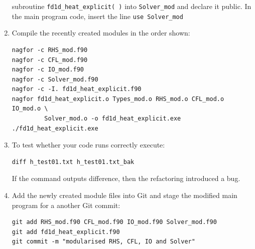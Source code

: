 \documentclass[12pt]{article}
\begin{document}
\begin{enumerate}
  subroutine \texttt{fd1d\_heat\_explicit( )} into \texttt{Solver\_mod} and declare it public. In the main
  program code, insert the line \texttt{use Solver\_mod}
\item Compile the recently created modules in the order shown:
\begin{verbatim}
nagfor -c RHS_mod.f90
nagfor -c CFL_mod.f90
nagfor -c IO_mod.f90
nagfor -c Solver_mod.f90
nagfor -c -I. fd1d_heat_explicit.f90
nagfor fd1d_heat_explicit.o Types_mod.o RHS_mod.o CFL_mod.o IO_mod.o \
         Solver_mod.o -o fd1d_heat_explicit.exe
./fd1d_heat_explicit.exe
\end{verbatim}
\item To test whether your code runs correctly execute:
\begin{verbatim}
diff h_test01.txt h_test01.txt_bak
\end{verbatim}
If the command outputs difference, then the refactoring introduced a bug.
\item Add the newly created module files into Git and stage the modified main program for a
another Git commit:
\begin{verbatim}
git add RHS_mod.f90 CFL_mod.f90 IO_mod.f90 Solver_mod.f90
git add fd1d_heat_explicit.f90
git commit -m "modularised RHS, CFL, IO and Solver"
\end{verbatim}
%
\end{enumerate}
\newpage
\end{document}
